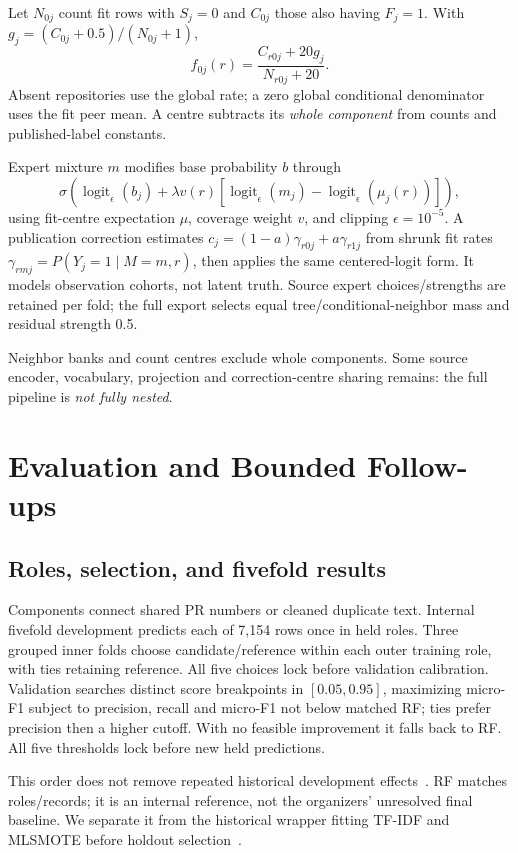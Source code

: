 \documentclass[10pt,conference]{IEEEtran}
\newcommand{\clogit}{\operatorname{logit}_{\epsilon}}
\begin{document}
Let $N_{0j}$ count fit rows with $S_j=0$ and $C_{0j}$ those also having $F_j=1$. With $g_j=(C_{0j}+0.5)/(N_{0j}+1)$,
\begin{equation}
f_{0j}(r)=\frac{C_{r0j}+20g_j}{N_{r0j}+20}. \label{eq:prior}
\end{equation}
Absent repositories use the global rate; a zero global conditional denominator uses the fit peer mean. A centre subtracts its \emph{whole component} from counts and published-label constants.

Expert mixture $m$ modifies base probability $b$ through
\begin{equation}
\sigma\!\left(\clogit(b_j)+\lambda v(r)
 [\clogit(m_j)-\clogit(\mu_j(r))]\right), \label{eq:residual}
\end{equation}
using fit-centre expectation $\mu$, coverage weight $v$, and clipping $\epsilon=10^{-5}$. A publication correction estimates $c_j=(1-a)\gamma_{r0j}+a\gamma_{r1j}$ from shrunk fit rates $\gamma_{rmj}=P(Y_j=1\mid M=m,r)$, then applies the same centered-logit form. It models observation cohorts, not latent truth. Source expert choices/strengths are retained per fold; the full export selects equal tree/conditional-neighbor mass and residual strength 0.5.

Neighbor banks and count centres exclude whole components. Some source encoder, vocabulary, projection and correction-centre sharing remains: the full pipeline is \emph{not fully nested}.

\section{Evaluation and Bounded Follow-ups}
\subsection{Roles, selection, and fivefold results}
Components connect shared PR numbers or cleaned duplicate text. Internal fivefold development predicts each of 7,154 rows once in held roles. Three grouped inner folds choose candidate/reference within each outer training role, with ties retaining reference. All five choices lock before validation calibration. Validation searches distinct score breakpoints in $[0.05,0.95]$, maximizing micro-F1 subject to precision, recall and micro-F1 not below matched RF; ties prefer precision then a higher cutoff. With no feasible improvement it falls back to RF. All five thresholds lock before new held predictions.

This order does not remove repeated historical development effects~\cite{cawley}. RF matches roles/records; it is an internal reference, not the organizers' unresolved final baseline. We separate it from the historical wrapper fitting TF-IDF and MLSMOTE before holdout selection~\cite{repository}.
\end{document}
